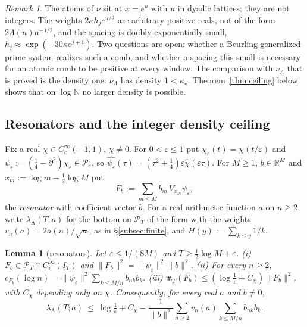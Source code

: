 \documentclass[11pt]{amsart}
\newtheorem{lemma}[theorem]{Lemma}
\theoremstyle{definition}
\theoremstyle{remark}
\newtheorem{remark}[theorem]{Remark}
\newcommand{\R}{\mathbb R}
\newcommand{\N}{\mathbb N}
\newcommand{\PT}{\mathcal P_T}
\newcommand{\IT}{I_T}
\newcommand{\mT}{\mathfrak m_T}
\begin{document}
\begin{remark}\label{rem:atomic}
The atoms of $\nu$ sit at $x=e^u$ with $u$ in dyadic lattices; they are not integers. The weights $2\kappa h_je^{u/2}$ are arbitrary
positive reals, not of the form $2\Lambda(n)n^{-1/2}$, and the spacing is doubly exponentially small,
$h_j\approx\exp(-30\kappa e^{j+1})$. Two questions are open: whether a Beurling generalized prime system realizes such a comb,
and whether a spacing this small is necessary for an atomic comb to be positive at every window. The comparison with
$\nu_\Lambda$ that is proved is the density one: $\nu_\Lambda$ has density $1<\kappa_\star$. Theorem~\ref{thm:ceiling} below shows that
on $\log\N$ no larger density is possible.
\end{remark}

\subsection{Resonators and the integer density ceiling}\label{subsec:reson}
Fix a real $\chi\in C_c^\infty(-1,1)$, $\chi\ne0$. For $0<\varepsilon\le1$ put $\chi_\varepsilon(t)=\chi(t/\varepsilon)$ and
$\psi_\varepsilon:=(\frac14-\partial^2)\chi_\varepsilon\in\mathcal P_\varepsilon$, so $\widehat{\psi_\varepsilon}(\tau)=(\tau^2+\frac14)\varepsilon\widehat\chi(\varepsilon\tau)$.
For $M\ge1$, $b\in\R^M$ and $x_m:=\log m-\frac12\log M$ put
\[
F_b:=\sum_{m\le M}b_m\,V_{x_m}\psi_\varepsilon,
\]
the \emph{resonator} with coefficient vector $b$. For a real arithmetic function $a$ on $n\ge2$ write
$\lambda_{\mathrm A}(T;a)$ for the bottom on $\PT$ of the form with the weights $v_n(a)=2a(n)/\sqrt n$, as in
\S\ref{subsec:finite}, and $H(y):=\sum_{k\le y}1/k$.

\begin{lemma}[resonators]\label{lem:reson}
Let $\varepsilon\le1/(8M)$ and $T\ge\frac12\log M+\varepsilon$.
\emph{(i)} $F_b\in\PT\cap C_c^\infty(\IT)$ and $\|F_b\|^2=\|\psi_\varepsilon\|^2\|b\|^2$.
\emph{(ii)} For every $n\ge2$, $c_{F_b}(\log n)=\|\psi_\varepsilon\|^2\sum_{k\le M/n}b_{nk}b_k$.
\emph{(iii)} $\mT(F_b)\le(\log\frac1\varepsilon+C_\chi)\|F_b\|^2$, with $C_\chi$ depending only on $\chi$.
Consequently, for every real $a$ and $b\ne0$,
\[
\lambda_{\mathrm A}(T;a)\ \le\ \log\tfrac1\varepsilon+C_\chi-\frac1{\|b\|^2}\sum_{n\ge2}v_n(a)\sum_{k\le M/n}b_{nk}b_k .
\]
\end{lemma}
\end{document}
